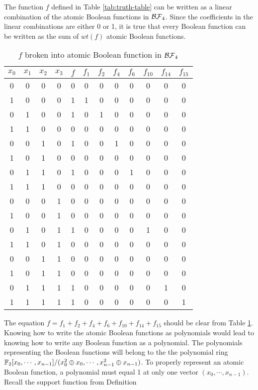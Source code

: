\par The function $f$ defined in Table \ref{tab:truth-table} can be written
as a linear combination of the atomic Boolean functions in $\mathcal{BF}_4$. Since
the coefficients in the linear combinations are either 0 or 1, it is true
that every Boolean function can be written as the sum of $wt(f)$ atomic
Boolean functions.
\begin{table}[h!]\label{tab:atomic-f}
  \centering
  \begin{tabular}{|c|c|c|c||c|c|c|c|c|c|c|c|}
    \hline
    $x_0$&$x_1$&$x_2$&$x_3$
      &$f$&$f_1$&$f_2$&$f_4$&$f_6$&$f_{10}$&$f_{14}$&$f_{15}$\\
    \hline
    0&0&0&0&0&0&0&0&0&0&0&0\\
    1&0&0&0&1&1&0&0&0&0&0&0\\
    0&1&0&0&1&0&1&0&0&0&0&0\\
    1&1&0&0&0&0&0&0&0&0&0&0\\
    0&0&1&0&1&0&0&1&0&0&0&0\\
    1&0&1&0&0&0&0&0&0&0&0&0\\
    0&1&1&0&1&0&0&0&1&0&0&0\\
    1&1&1&0&0&0&0&0&0&0&0&0\\
    0&0&0&1&0&0&0&0&0&0&0&0\\
    1&0&0&1&0&0&0&0&0&0&0&0\\
    0&1&0&1&1&0&0&0&0&1&0&0\\
    1&1&0&1&0&0&0&0&0&0&0&0\\
    0&0&1&1&0&0&0&0&0&0&0&0\\
    1&0&1&1&0&0&0&0&0&0&0&0\\
    0&1&1&1&1&0&0&0&0&0&1&0\\
    1&1&1&1&1&0&0&0&0&0&0&1\\
    \hline
  \end{tabular}
  \caption{$f$ broken into atomic Boolean function in $\mathcal{BF}_4$}
\end{table}
\par The equation $f=f_1+f_2+f_4+f_6+f_{10}+f_{14}+f_{15}$ should be clear
from Table \ref{tab:atomic-f}. Knowing how to write the atomic Boolean
functions as polynomials would lead to knowing how to write any Boolean
function as a polynomial. The polynomials representing the Boolean functions
will belong to the the polynomial ring $\mathbb{F}_2[x_0,\cdots,x_{n-1}]/
(x_0^2\oplus x_0,\cdots,x_{n-1}^2\oplus x_{n-1})$. To properly represent
an atomic Boolean function, a polynomial must equal 1 at only one vector
$(x_0,\cdots,x_{n-1})$. Recall the support function from Definition
